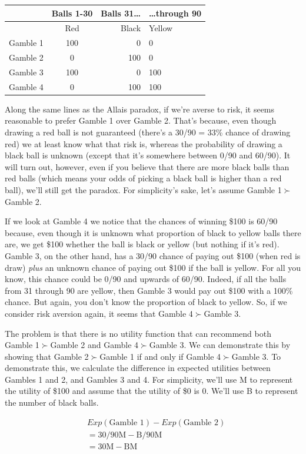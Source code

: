 \documentclass[]{tufte-book}
\begin{document}
\begin{longtable}[]{@{}lcrl@{}}
\toprule
& Balls 1-30 & Balls 31\ldots{} & \ldots{}through 90\tabularnewline
\midrule
\endhead
& Red & Black & Yellow\tabularnewline
Gamble 1 & 100 & 0 & 0\tabularnewline
Gamble 2 & 0 & 100 & 0\tabularnewline
Gamble 3 & 100 & 0 & 100\tabularnewline
Gamble 4 & 0 & 100 & 100\tabularnewline
\bottomrule
\end{longtable}

Along the same lines as the Allais paradox, if we're averse to risk, it seems reasonable to prefer Gamble 1 over Gamble 2. That's because, even though drawing a red ball is not guaranteed (there's a 30/90 = 33\% chance of drawing red) we at least know what that risk is, whereas the probability of drawing a black ball is unknown (except that it's somewhere between 0/90 and 60/90). It will turn out, however, even if you believe that there are more black balls than red balls (which means your odds of picking a black ball is higher than a red ball), we'll still get the paradox. For simplicity's sake, let's assume Gamble 1\(\succ\)Gamble 2.

If we look at Gamble 4 we notice that the chances of winning \$100 is 60/90 because, even though it is unknown what proportion of black to yellow balls there are, we get \$100 whether the ball is black or yellow (but nothing if it's red). Gamble 3, on the other hand, has a 30/90 chance of paying out \$100 (when red is draw) \emph{plus} an unknown chance of paying out \$100 if the ball is yellow. For all you know, this chance could be 0/90 and upwards of 60/90. Indeed, if all the balls from 31 through 90 are yellow, then Gamble 3 would pay out \$100 with a 100\% chance. But again, you don't know the proportion of black to yellow. So, if we consider risk aversion again, it seems that Gamble 4\(\succ\)Gamble 3.

The problem is that there is no utility function that can recommend both Gamble 1\(\succ\)Gamble 2 and Gamble 4\(\succ\)Gamble 3. We can demonstrate this by showing that Gamble 2\(\succ\)Gamble 1 if and only if Gamble 4\(\succ\)Gamble 3. To demonstrate this, we calculate the difference in expected utilities between Gambles 1 and 2, and Gambles 3 and 4. For simplicity, we'll use M to represent the utility of \$100 and assume that the utility of \$0 is 0. We'll use B to represent the number of black balls.

\[
\begin{split}
& Exp(\text{Gamble 1}) - Exp(\text{Gamble 2})  \\
&= 30/90\text{M} - \text{B}/90\text{M}  \\
&= 30\text{M} - \text{BM}
\end{split}
\]
\end{document}
